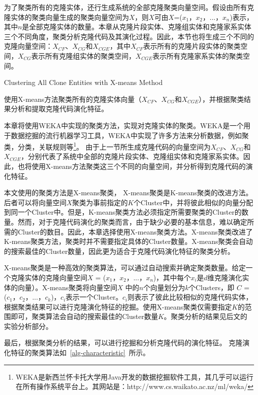 为了聚类所有的克隆实体，还行生成系统的全部克隆聚类向量空间。假设由所有克隆实体的聚类向量生成的聚类向量空间为$X$，则$X$可由{$X$={($x_1$，$x_2$，$...$，$x_n$)}}表示，其中$n$是全部克隆实体的数量。本章从克隆片段实体、克隆组实体和克隆家系实体三个不同角度，聚类分析克隆代码及其演化过程。因此，本节也将生成三个不同的克隆向量空间：$X_{CF}$、$X_{CG}$和$X_{CGE}$，其中$X_{CF}$表示所有的克隆片段实体的聚类空间，$X_{CG}$表示所有克隆组实体的聚类空间，$X_{CGE}$表示所有克隆家系实体的聚类空间。

{Clustering All Clone Entities with X-means Method}

使用X-means方法聚类所有的克隆实体向量（$X_{CF}$、$X_{CG}$和$X_{CGE}$），并根据聚类结果分析和提取克隆代码演化特征。

本章将使用WEKA中实现的聚类方法，实现对克隆实体的聚类。WEKA是一个用于数据挖掘的流行机器学习工具，WEKA中实现了许多方法来分析数据，例如聚类，分类，关联规则等\footnote{WEKA是新西兰怀卡托大学用Java开发的数据挖掘软件工具，其几乎可以运行在所有操作系统平台上。其网站是：http://www.cs.waikato.ac.nz/ml/weka/}。 由于上一节所生成克隆代码的向量空间为$X_{CF}$、$X_{CG}$和$X_{CGE}$，分别代表了系统中全部的克隆片段实体、克隆组实体和克隆家系实体。因此，也将使用X-means方法聚类这三个不同的向量空间，并分析得到克隆代码的演化特征。

本文使用的聚类方法是X-means聚类\cite{pelleg2000x}， X-means聚类是K-means聚类\cite{arthur2007k}的改进方法。后者可以将向量空间$X$聚类为事前指定的$K$个Cluster中，并将彼此相似的向量分配到同一个Cluster中。但是，K-means聚类方法必须指定所需要聚类的Cluster的数量。然而，对于克隆代码演化的聚类而言，由于缺少必要的基本信息，难以确定所需的Cluster的数目。因此，本章选择使用X-means聚类方法。X-means聚类改进了K-means聚类方法，聚类时并不需要指定具体的Cluster数量。X-means聚类会自动的搜索最佳的Cluster数量，因此更为适合于克隆代码演化特征的聚类分析。

X-means聚类是一种高效的聚类算法，可以通过自动搜索并确定聚类数量\cite{pelleg2000x}。给定一个克隆实体的克隆向量空间$X$ = {($x_1$，$x_2$，$...$，$x_n$)}，其中每个$x_i$是$d$维克隆演化实体的向量）。X-means聚类将向量空间$X$ 中的$n$个向量划分为$k$个Clusters，即 $C$ = {($c_1$，$c_2$，$...$，$c_k$)}，$c_i$表示一个Cluster。$c_i$则表示了彼此比较相似的克隆代码实体，根据聚类结果可以进行克隆演化特征的挖掘。使用X-means聚类仅需要指定$K$的范围即可，聚类算法会自动的搜索最佳的Cluster数量$K$。聚类分析的结果见后文的实验分析部分。

最后，根据聚类分析的结果，可以进行挖掘和分析克隆代码的演化特征。
克隆演化特征的聚类算法如~\ref{alg-characteristic}~所示。

